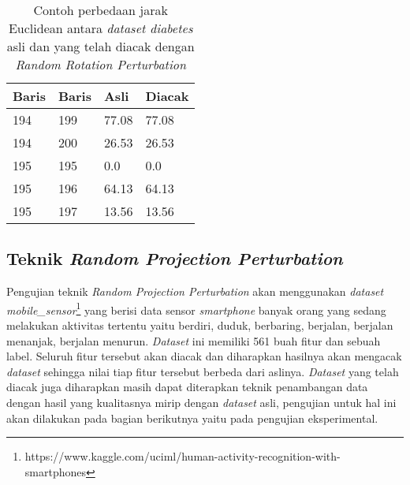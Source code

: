 \begin{table}
	\centering
	\caption{Contoh perbedaan jarak Euclidean antara \textit{dataset diabetes} asli dan yang telah diacak dengan \textit{Random Rotation Perturbation}}
	\begin{tabular}{ll|ll}
		\hline
		Baris&Baris&Asli&Diacak \\ \hline
		194&199&77.08&77.08 \\
		194&200&26.53&26.53 \\
		195&195&0.0&0.0 \\
		195&196&64.13&64.13 \\
		195&197&13.56&13.56 \\
		\hline
	\end{tabular}
	\label{table:uji-rotation}
\end{table}

\subsection{Teknik \textit{Random Projection Perturbation}}
\label{subsec:rpp-fungsional}

Pengujian teknik \textit{Random Projection Perturbation} akan menggunakan \textit{dataset} \textit{mobile\_sensor}\footnote{https://www.kaggle.com/uciml/human-activity-recognition-with-smartphones} yang berisi data sensor \textit{smartphone} banyak orang yang sedang melakukan aktivitas tertentu yaitu berdiri, duduk, berbaring, berjalan, berjalan menanjak, berjalan menurun. \textit{Dataset} ini memiliki 561 buah fitur dan sebuah label. Seluruh fitur tersebut akan diacak dan diharapkan hasilnya akan mengacak \textit{dataset} sehingga nilai tiap fitur tersebut berbeda dari aslinya. \textit{Dataset} yang telah diacak juga diharapkan masih dapat diterapkan teknik penambangan data dengan hasil yang kualitasnya mirip dengan \textit{dataset} asli, pengujian untuk hal ini akan dilakukan pada bagian berikutnya yaitu pada pengujian eksperimental.

